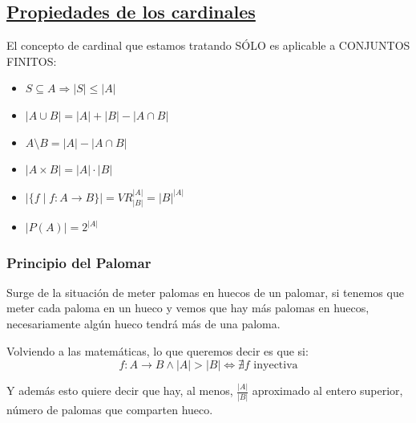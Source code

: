 \documentclass[10pt,a4paper,openright]{book}
\begin{document}
\subsection*{\underline{Propiedades de los cardinales}}
El concepto de cardinal que estamos tratando SÓLO es aplicable a CONJUNTOS FINITOS:
\begin{itemize}
\item $S\subseteq A\Rightarrow |S|\leq |A|$
\item $|A\cup B|=|A|+|B|-|A\cap B|$
\item $A\mbox{\textbackslash}B=|A|-|A\cap B|$
\item $|A\times B|=|A|\cdot |B|$
\item $|\{f\mid f: A\longrightarrow B\}|=VR_{|B|}^{|A|}=|B|^{|A|}$
\item $|P(A)|=2^{|A|}$
\end{itemize}

\subsubsection*{Principio del Palomar}
Surge de la situación de meter palomas en huecos de un palomar, si tenemos que meter cada paloma en un hueco y vemos que hay más palomas en huecos, necesariamente algún hueco tendrá más de una paloma.\par

Volviendo a las matemáticas, lo que queremos decir es que si:
$$f:A\longrightarrow B\wedge |A|>|B|\Leftrightarrow \nexists f\mbox{ inyectiva}$$

Y además esto quiere decir que hay, al menos, $\frac{|A|}{|B|}$ aproximado al entero superior, número de palomas que comparten hueco.
\end{document}
